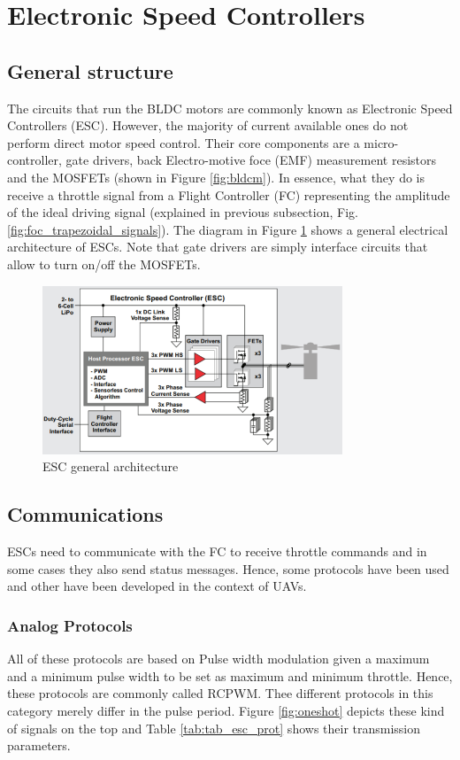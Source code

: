 \section{Electronic Speed Controllers}
\subsection{General structure}
The circuits that run the BLDC motors are commonly known as Electronic Speed Controllers (ESC). However, the majority of current available ones do not perform direct motor speed control. Their core components are a micro-controller, gate drivers, back Electro-motive foce (EMF) measurement resistors and the MOSFETs (shown in Figure \ref{fig:bldcm}). In essence, what they do is receive a throttle signal from a Flight Controller (FC) representing the amplitude of the ideal driving signal (explained in previous subsection, Fig. \ref{fig:foc_trapezoidal_signals}). The diagram in Figure \ref{fig:esc_diag} shows a general electrical architecture of ESCs. Note that gate drivers are simply interface circuits that allow to turn on/off the MOSFETs.
\begin{figure}
    \centering
    \includegraphics[width=0.8\textwidth]{images/esc_diagram.PNG}
    \caption{ESC general architecture \cite{Mogensen_ESC_Motor_Control2016}}
    \label{fig:esc_diag}
\end{figure}

\subsection{Communications}
ESCs need to communicate with the FC to receive throttle commands and in some cases they also send status messages. Hence, some protocols have been used and other have been developed in the context of UAVs.

\subsubsection{Analog Protocols}
All of these protocols are based on Pulse width modulation given a maximum and a minimum pulse width to be set as maximum and minimum throttle. Hence, these protocols are commonly called RCPWM. Thee different protocols in this category merely differ in the pulse period. Figure \ref{fig:oneshot} depicts these kind of signals on the top and Table \ref{tab:tab_esc_prot}  shows their transmission parameters.


